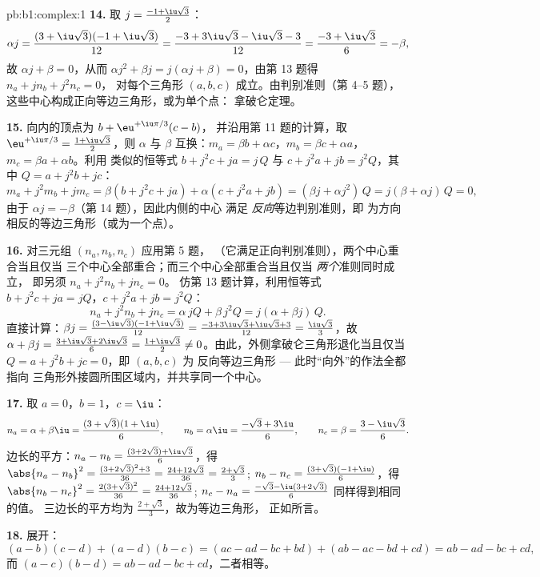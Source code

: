 \begin{solution}{pb:b1:complex:1}
\textbf{14.} 取 $j = \frac{-1 + \iu\sqrt3}2$：
\[
\alpha j = \frac{(3 + \iu\sqrt3)(-1 + \iu\sqrt3)}{12}
= \frac{-3 + 3\iu\sqrt3 - \iu\sqrt3 - 3}{12}
= \frac{-3 + \iu\sqrt3}6 = -\beta ,
\]
故 $\alpha j + \beta = 0$，从而 $\alpha j^2 + \beta j = j(\alpha j
+ \beta) = 0$，由第 13 题得 $n_a + jn_b + j^2n_c = 0$，
对每个三角形 $(a, b, c)$ 成立。由判别准则（第 4--5 题），
这些中心构成正向等边三角形，或为单个点：
拿破仑定理。

\textbf{15.} 向内的顶点为 $b + \eu^{+\iu\pi/3}(c - b)$，
并沿用第 11 题的计算，取 $\eu^{+\iu\pi/3} = \frac{1 +
\iu\sqrt3}2$，则 $\alpha$ 与 $\beta$ 互换：$m_a = \beta b + \alpha
c$，$m_b = \beta c + \alpha a$，$m_c = \beta a + \alpha b$。利用
类似的恒等式 $b + j^2c + ja = j\,Q$ 与 $c + j^2a + jb
= j^2 Q$，其中 $Q = a + j^2b + jc$：
\[
m_a + j^2 m_b + j m_c
= \beta(b + j^2 c + ja) + \alpha(c + j^2 a + jb)
= (\beta j + \alpha j^2)\, Q = j(\beta + \alpha j)\,Q = 0 ,
\]
由于 $\alpha j = -\beta$（第 14 题），因此内侧的中心
满足 \emph{反向}等边判别准则，即
为方向相反的等边三角形（或为一个点）。

\textbf{16.} 对三元组 $(n_a, n_b, n_c)$ 应用第 5 题，
（它满足正向判别准则），两个中心重合当且仅当
三个中心全部重合；而三个中心全部重合当且仅当 \emph{两个}准则同时成立，
即另须 $n_a + j^2 n_b + j n_c = 0$。
仿第 13 题计算，利用恒等式 $b + j^2c + ja = jQ$，$c + j^2a +
jb = j^2Q$：
\[
n_a + j^2 n_b + j n_c
= \alpha\,jQ + \beta\,j^2 Q = j(\alpha + \beta j)\,Q .
\]
直接计算：$\beta j = \frac{(3 -
\iu\sqrt3)(-1 + \iu\sqrt3)}{12} = \frac{-3 + 3\iu\sqrt3 +
\iu\sqrt3 + 3}{12} = \frac{\iu\sqrt3}3$，故 $\alpha + \beta j =
\frac{3 + \iu\sqrt3 + 2\iu\sqrt3}6 = \frac{1 + \iu\sqrt3}2 \neq
0$。由此，外侧拿破仑三角形退化当且仅当 $Q = a +
j^2b + jc = 0$，即 $(a, b, c)$ 为
反向等边三角形 --- 此时“向外”的作法全都指向
三角形外接圆所围区域内，并共享同一个中心。

\textbf{17.} 取 $a = 0$，$b = 1$，$c = \iu$：
\[
n_a = \alpha + \beta\iu = \frac{(3 + \sqrt3)(1 + \iu)}6,
\qquad
n_b = \alpha\iu = \frac{-\sqrt3 + 3\iu}6,
\qquad
n_c = \beta = \frac{3 - \iu\sqrt3}6 .
\]
边长的平方：$n_a - n_b = \frac{(3 + 2\sqrt3) +
\iu\sqrt3}6$，得 $\abs{n_a - n_b}^2 = \frac{(3 + 2\sqrt3)^2 +
3}{36} = \frac{24 + 12\sqrt3}{36} = \frac{2 + \sqrt3}3$; $n_b -
n_c = \frac{(3 + \sqrt3)(-1 + \iu)}6$，得 $\abs{n_b - n_c}^2 =
\frac{2(3 + \sqrt3)^2}{36} = \frac{24 + 12\sqrt3}{36}$; $n_c - n_a
= \frac{-\sqrt3 - \iu(3 + 2\sqrt3)}6$ 同样得到相同的值。
三边长的平方均为 $\frac{2 + \sqrt3}3$，故为等边三角形，
正如所言。

\textbf{18.} 展开：
\[
(a - b)(c - d) + (a - d)(b - c)
= (ac - ad - bc + bd) + (ab - ac - bd + cd)
= ab - ad - bc + cd ,
\]
而 $(a - c)(b - d) = ab - ad - bc + cd$，二者相等。


\end{solution}

